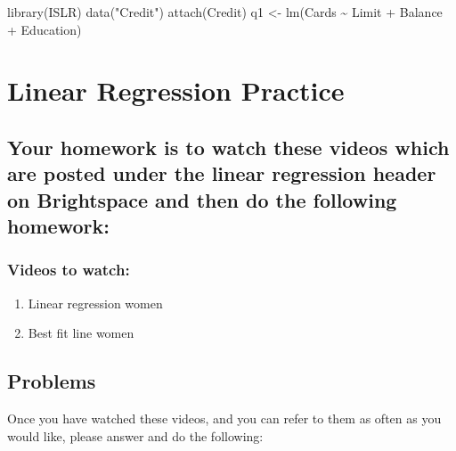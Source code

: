 \documentclass[
]{book}
\newenvironment{Shaded}{\begin{snugshade}}{\end{snugshade}}
\newcommand{\FunctionTok}[1]{\textcolor[rgb]{0.00,0.00,0.00}{#1}}
\newcommand{\NormalTok}[1]{#1}
\newcommand{\OtherTok}[1]{\textcolor[rgb]{0.56,0.35,0.01}{#1}}
\newcommand{\SpecialCharTok}[1]{\textcolor[rgb]{0.00,0.00,0.00}{#1}}
\newcommand{\StringTok}[1]{\textcolor[rgb]{0.31,0.60,0.02}{#1}}
\providecommand{\tightlist}{%
  \setlength{\itemsep}{0pt}\setlength{\parskip}{0pt}}
\begin{document}
\begin{Shaded}
\begin{Highlighting}[]
\FunctionTok{library}\NormalTok{(ISLR)}
\FunctionTok{data}\NormalTok{(}\StringTok{"Credit"}\NormalTok{)}
\FunctionTok{attach}\NormalTok{(Credit)}
\NormalTok{q1 }\OtherTok{\textless{}{-}} \FunctionTok{lm}\NormalTok{(Cards }\SpecialCharTok{\textasciitilde{}}\NormalTok{ Limit }\SpecialCharTok{+}\NormalTok{ Balance }\SpecialCharTok{+}\NormalTok{ Education)}
\end{Highlighting}
\end{Shaded}

\hypertarget{linear-regression-practice}{%
\chapter{Linear Regression Practice}\label{linear-regression-practice}}

\hypertarget{your-homework-is-to-watch-these-videos-which-are-posted-under-the-linear-regression-header-on-brightspace-and-then-do-the-following-homework}{%
\section{Your homework is to watch these videos which are posted under the linear regression header on Brightspace and then do the following homework:}\label{your-homework-is-to-watch-these-videos-which-are-posted-under-the-linear-regression-header-on-brightspace-and-then-do-the-following-homework}}

\hypertarget{videos-to-watch}{%
\subsection{Videos to watch:}\label{videos-to-watch}}

\begin{enumerate}
\def\labelenumi{\arabic{enumi}.}
\tightlist
\item
  Linear regression women
\item
  Best fit line women
\end{enumerate}

\hypertarget{problems}{%
\section{Problems}\label{problems}}

Once you have watched these videos, and you can refer to them as often as you would like, please answer and do the following:
\end{document}

